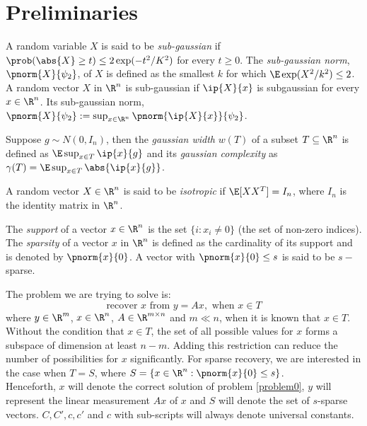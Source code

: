 \section{Preliminaries}
\begin{definition}
	A random variable $X$ is said to be \emph{sub-gaussian}
	if $\prob(\abs{X}\geq t)\leq 2\exp(-t^2/K^2)$ for
	every $t\geq 0$. The \emph{sub-gaussian norm}, $\pnorm{X}{\psi_2}$,
	of $X$ is defined as the smallest $k$ for which
	$\E\exp(X^2/k^2)\leq 2$.
	A random vector $X$ in $\R^n$ is sub-gaussian if
	$\ip{X}{x}$ is subgaussian for every $x\in\R^n$. Its
	sub-gaussian norm, $\pnorm{X}{\psi_2} := \sup_{x\in\R^n}
	\pnorm{\ip{X}{x}}{\psi_2}$.
\end{definition}

\begin{definition}
	Suppose $g\sim N(0, I_n)$, then
	the \emph{gaussian width} $w(T)$ of a subset $T\subseteq \R^n$ is
	defined as $\E\sup_{x\in T}\ip{x}{g}$ and its \emph{gaussian
	complexity} as $\gamma(T) = \E\sup_{x\in T}\abs{\ip{x}{g}}$.
\end{definition}

\begin{definition}
	A random vector $X \in \R^n$ is said to
	be \emph{isotropic} if $\E[XX^T] = I_n$, where
	$I_n$ is the identity matrix in $\R^n$.
\end{definition}

\begin{definition}[Sparsity]
	The \emph{support} of a vector $x\in \R^n$ is the set
	$\{i: x_i\neq 0\}$ (the set of non-zero indices).
	The \emph{sparsity} of a vector $x$ in $\R^n$ is defined as the
	cardinality of its support and is denoted by $\pnorm{x}{0}$.
	A vector with $\pnorm{x}{0}\leq s$ is said to be $s-$sparse.
\end{definition}
The problem we are trying to solve is:
\begin{equation}\label{problem0}
	\text{recover }x\text{ from }y = Ax,\text{ when }x\in T
\end{equation}
where $y\in\R^m$, $x\in\R^n$, $A\in\R^{m\times n}$ and $m\ll n$, when
it is known that $x\in T$.
Without the condition that $x\in T$, the set of all possible values for $x$
forms a subspace of dimension at least $n-m$.
Adding this restriction can reduce the number of possibilities for $x$
significantly. For sparse recovery, we are interested in the case when
$T = S$, where $S = \{x\in\R^n: \pnorm{x}{0}\leq s\}$.\\

Henceforth, $x$ will denote the correct solution of problem \eqref{problem0},
$y$ will represent the linear measurement $Ax$ of $x$ and $S$
will denote the set of $s$-sparse vectors.
$C, C', c, c'$ and $c$ with sub-scripts will always denote universal
constants.
